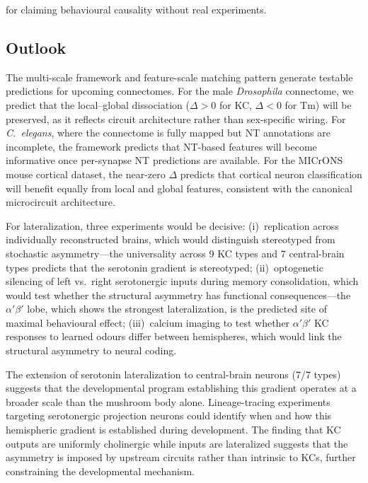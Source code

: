 \documentclass[10pt]{article}
\begin{document}
for claiming behavioural causality without real experiments.

\subsection*{Outlook}

The multi-scale framework and feature-scale matching pattern generate testable predictions for upcoming connectomes. For the male \textit{Drosophila} connectome, we predict that the local--global dissociation ($\Delta > 0$ for KC, $\Delta < 0$ for Tm) will be preserved, as it reflects circuit architecture rather than sex-specific wiring. For \textit{C.~elegans}, where the connectome is fully mapped but NT annotations are incomplete, the framework predicts that NT-based features will become informative once per-synapse NT predictions are available. For the MICrONS mouse cortical dataset, the near-zero $\Delta$ predicts that cortical neuron classification will benefit equally from local and global features, consistent with the canonical microcircuit architecture.

For lateralization, three experiments would be decisive: (i)~replication across individually reconstructed brains, which would distinguish stereotyped from stochastic asymmetry---the universality across 9 KC types and 7 central-brain types predicts that the serotonin gradient is stereotyped; (ii)~optogenetic silencing of left vs.\ right serotonergic inputs during memory consolidation, which would test whether the structural asymmetry has functional consequences---the $\alpha'\beta'$ lobe, which shows the strongest lateralization, is the predicted site of maximal behavioural effect; (iii)~calcium imaging to test whether $\alpha'\beta'$ KC responses to learned odours differ between hemispheres, which would link the structural asymmetry to neural coding.

The extension of serotonin lateralization to central-brain neurons (7/7 types) suggests that the developmental program establishing this gradient operates at a broader scale than the mushroom body alone. Lineage-tracing experiments targeting serotonergic projection neurons could identify when and how this hemispheric gradient is established during development. The finding that KC outputs are uniformly cholinergic while inputs are lateralized suggests that the asymmetry is imposed by upstream circuits rather than intrinsic to KCs, further constraining the developmental mechanism.

\end{document}
